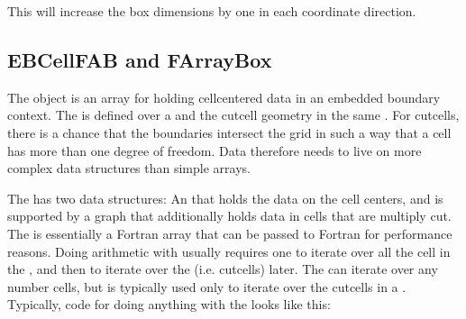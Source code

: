 \documentclass[letterpaper,10pt,english]{sphinxmanual}
\begin{document}
This will increase the box dimensions by one in each coordinate direction.


\subsection{EBCellFAB and FArrayBox}
\label{\detokenize{Basics:ebcellfab-and-farraybox}}
The  object is an array for holding cell\sphinxhyphen{}centered data in an embedded boundary context.
The  is defined over a  and the cut\sphinxhyphen{}cell geometry in the same .
For cut\sphinxhyphen{}cells, there is a chance that the boundaries intersect the grid in such a way that a cell has more than one degree of freedom.
Data therefore needs to live on more complex data structures than simple arrays.

The  has two data structures: An  that holds the data on the cell centers, and is supported by a graph that additionally holds data in cells that are multiply cut.
The  is essentially a Fortran array that can be passed to Fortran for performance reasons.
Doing arithmetic with  usually requires one to iterate over all the cell in the , and then to iterate over the  (i.e. cut\sphinxhyphen{}cells) later.
The  can iterate over any number cells, but is typically used only to iterate over the cut\sphinxhyphen{}cells in a .
Typically, code for doing anything with the  looks like this:

\begin{sphinxVerbatim}[commandchars=\\\{\},formatcom=\scriptsize]

    
\end{sphinxVerbatim}
\end{document}
